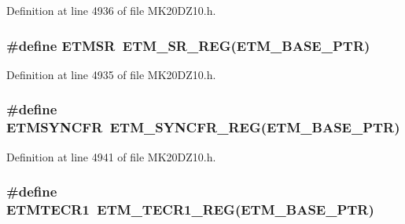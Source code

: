 Definition at line 4936 of file M\+K20\+D\+Z10.\+h.

\subsubsection[{\texorpdfstring{E\+T\+M\+SR}{ETMSR}}]{\setlength{\rightskip}{0pt plus 5cm}\#define E\+T\+M\+SR~{\bf E\+T\+M\+\_\+\+S\+R\+\_\+\+R\+EG}({\bf E\+T\+M\+\_\+\+B\+A\+S\+E\+\_\+\+P\+TR})}\hypertarget{group___e_t_m___register___accessor___macros_gacd765d3e050b4d26f061f12c5a522130}{}\label{group___e_t_m___register___accessor___macros_gacd765d3e050b4d26f061f12c5a522130}


Definition at line 4935 of file M\+K20\+D\+Z10.\+h.

\subsubsection[{\texorpdfstring{E\+T\+M\+S\+Y\+N\+C\+FR}{ETMSYNCFR}}]{\setlength{\rightskip}{0pt plus 5cm}\#define E\+T\+M\+S\+Y\+N\+C\+FR~{\bf E\+T\+M\+\_\+\+S\+Y\+N\+C\+F\+R\+\_\+\+R\+EG}({\bf E\+T\+M\+\_\+\+B\+A\+S\+E\+\_\+\+P\+TR})}\hypertarget{group___e_t_m___register___accessor___macros_ga799980862109ec912369fe94d821d64b}{}\label{group___e_t_m___register___accessor___macros_ga799980862109ec912369fe94d821d64b}


Definition at line 4941 of file M\+K20\+D\+Z10.\+h.

\subsubsection[{\texorpdfstring{E\+T\+M\+T\+E\+C\+R1}{ETMTECR1}}]{\setlength{\rightskip}{0pt plus 5cm}\#define E\+T\+M\+T\+E\+C\+R1~{\bf E\+T\+M\+\_\+\+T\+E\+C\+R1\+\_\+\+R\+EG}({\bf E\+T\+M\+\_\+\+B\+A\+S\+E\+\_\+\+P\+TR})}\hypertarget{group___e_t_m___register___accessor___macros_ga4019ecd242cf12aa19414624f3c36595}{}\label{group___e_t_m___register___accessor___macros_ga4019ecd242cf12aa19414624f3c36595}


